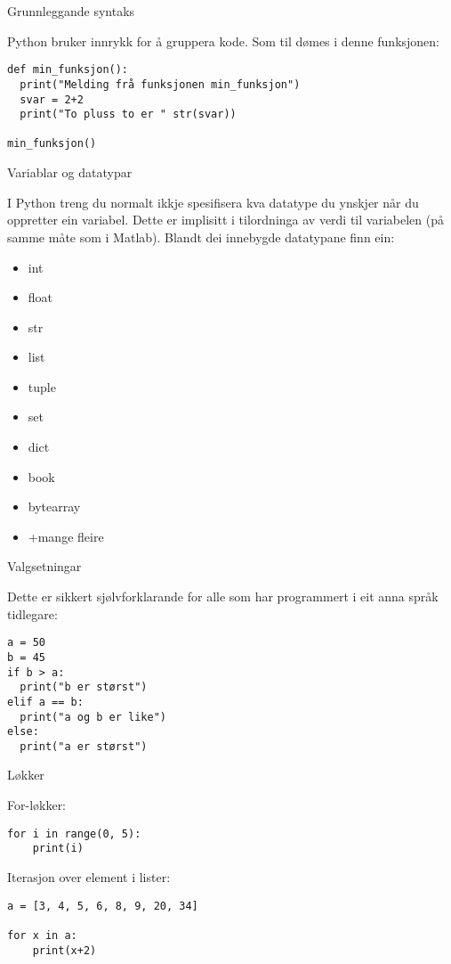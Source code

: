 
\begin{frame}[containsverbatim]{Grunnleggande syntaks}

  Python bruker innrykk for å gruppera kode. Som til dømes i denne funksjonen:

\begin{verbatim}
def min_funksjon():
  print("Melding frå funksjonen min_funksjon")
  svar = 2+2
  print("To pluss to er " str(svar))

min_funksjon()
\end{verbatim}
  
\end{frame}

\begin{frame}{Variablar og datatypar}

  I Python treng du normalt ikkje spesifisera kva datatype du ynskjer når du oppretter ein variabel. Dette er implisitt i tilordninga av verdi til variabelen (på samme måte som i Matlab). Blandt dei innebygde datatypane finn ein:
  
  \begin{itemize}
  \item int
  \item float
  \item str
  \item list
  \item tuple
  \item set
  \item dict
  \item book
  \item bytearray
    \item +mange fleire
  \end{itemize}
  
\end{frame}

\begin{frame}[containsverbatim]{Valgsetningar}

  Dette er sikkert sjølvforklarande for alle som har programmert i eit anna språk tidlegare:
  
\begin{verbatim}
a = 50
b = 45
if b > a:
  print("b er størst")
elif a == b:
  print("a og b er like")
else:
  print("a er størst")
\end{verbatim}
  
\end{frame}

\begin{frame}[containsverbatim]{Løkker}

For-løkker:

\begin{verbatim}
for i in range(0, 5):
	print(i)
\end{verbatim}

Iterasjon over element i lister:

\begin{verbatim}
a = [3, 4, 5, 6, 8, 9, 20, 34]

for x in a:
	print(x+2)
\end{verbatim}
  
\end{frame}

